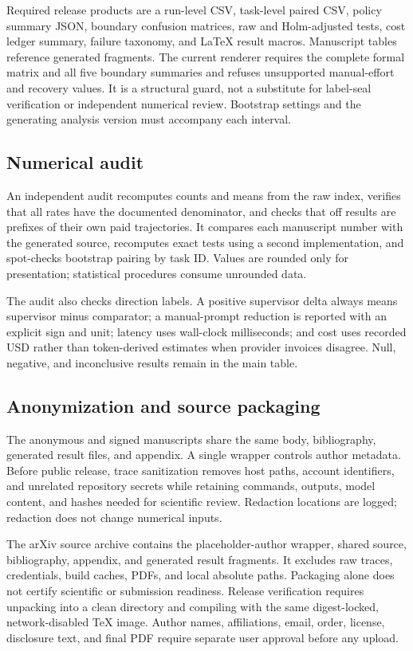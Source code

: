 Required release products are a run-level CSV, task-level paired CSV, policy summary JSON, boundary confusion matrices, raw and Holm-adjusted tests, cost ledger summary, failure taxonomy, and LaTeX result macros. Manuscript tables reference generated fragments. The current renderer requires the complete formal matrix and all five boundary summaries and refuses unsupported manual-effort and recovery values. It is a structural guard, not a substitute for label-seal verification or independent numerical review. Bootstrap settings and the generating analysis version must accompany each interval.

\subsection{Numerical audit}

An independent audit recomputes counts and means from the raw index, verifies that all rates have the documented denominator, and checks that off results are prefixes of their own paid trajectories. It compares each manuscript number with the generated source, recomputes exact tests using a second implementation, and spot-checks bootstrap pairing by task ID. Values are rounded only for presentation; statistical procedures consume unrounded data.

The audit also checks direction labels. A positive supervisor delta always means supervisor minus comparator; a manual-prompt reduction is reported with an explicit sign and unit; latency uses wall-clock milliseconds; and cost uses recorded USD rather than token-derived estimates when provider invoices disagree. Null, negative, and inconclusive results remain in the main table.

\subsection{Anonymization and source packaging}

The anonymous and signed manuscripts share the same body, bibliography, generated result files, and appendix. A single wrapper controls author metadata. Before public release, trace sanitization removes host paths, account identifiers, and unrelated repository secrets while retaining commands, outputs, model content, and hashes needed for scientific review. Redaction locations are logged; redaction does not change numerical inputs.

The arXiv source archive contains the placeholder-author wrapper, shared source, bibliography, appendix, and generated result fragments. It excludes raw traces, credentials, build caches, PDFs, and local absolute paths. Packaging alone does not certify scientific or submission readiness. Release verification requires unpacking into a clean directory and compiling with the same digest-locked, network-disabled TeX image. Author names, affiliations, email, order, license, disclosure text, and final PDF require separate user approval before any upload.

